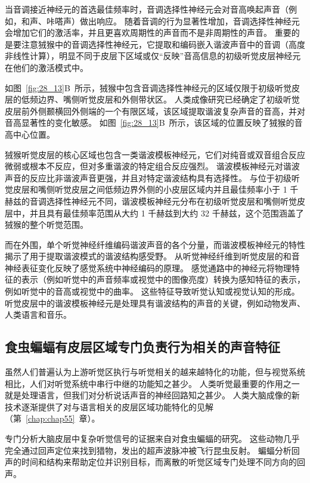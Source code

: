 当音调接近神经元的首选最佳频率时，音调选择性神经元会对音高唤起声音（例如，和声、咔嗒声）做出响应。
随着音调的行为显著性增加，音调选择性神经元会增加它们的激活率，并且更喜欢周期性的声音而不是非周期性的声音。
重要的是要注意狨猴中的音调选择性神经元，它提取和编码嵌入谐波声音中的音调（高度非线性计算），明显不同于皮层下区域或仅“反映”音高信息的初级听觉皮层神经元在他们的激活模式中。


如图~\ref{fig:28_13}B~所示，狨猴中包含音调选择性神经元的区域仅限于初级听觉皮层的低频边界、嘴侧听觉皮层和外侧带状区。
人类成像研究已经确定了初级听觉皮层前外侧颞横回外侧端的一个有限区域，该区域提取谐波复杂声音的音高，并对音高显著性的变化敏感。
如图~\ref{fig:28_13}B~所示，该区域的位置反映了狨猴的音高中心位置。


狨猴听觉皮层的核心区域也包含一类谐波模板神经元，它们对纯音或双音组合反应微弱或根本不反应，但对多重谐波的特定组合反应强烈。
谐波模板神经元对谐波声音的反应比非谐波声音更强，并且对特定谐波结构具有选择性。
与位于初级听觉皮层和嘴侧听觉皮层之间低频边界外侧的小皮层区域内并且最佳频率小于 1 千赫兹的音调选择性神经元不同，谐波模板神经元分布在初级听觉皮层和嘴侧听觉皮层中，并且具有最佳频率范围从大约 1 千赫兹到大约 32 千赫兹，这个范围涵盖了狨猴的整个听觉范围。


而在外围，单个听觉神经纤维编码谐波声音的各个分量，而谐波模板神经元的特性揭示了用于提取谐波模式的谐波结构感受野。
从听觉神经纤维到听觉皮层的和音神经表征变化反映了感觉系统中神经编码的原理。
感觉通路中的神经元将物理特征的表示（例如听觉中的声音频率或视觉中的图像亮度）转换为感知特征的表示，例如听觉中的音高或视觉中的曲率。
这些特征导致听觉认知或视觉认知的形成。
听觉皮层中的谐波模板神经元是处理具有谐波结构的声音的关键，例如动物发声、人类语言和音乐。



\subsection{食虫蝙蝠有皮层区域专门负责行为相关的声音特征}

虽然人们普遍认为上游听觉区执行与听觉相关的越来越特化的功能，但与视觉系统相比，人们对听觉系统中串行中继的功能知之甚少。
人类听觉最重要的作用之一就是处理语言，但我们对分析说话声音的神经回路知之甚少。
人类大脑成像的新技术逐渐提供了对与语言相关的皮层区域功能特化的见解（第~\ref{chap:chap55}~章）。


专门分析大脑皮层中复杂听觉信号的证据来自对食虫蝙蝠的研究。
这些动物几乎完全通过回声定位来找到猎物，发出的超声波脉冲被飞行昆虫反射。
蝙蝠分析回声的时间和结构来帮助定位并识别目标，而离散的听觉区域专门处理不同方向的回声。


